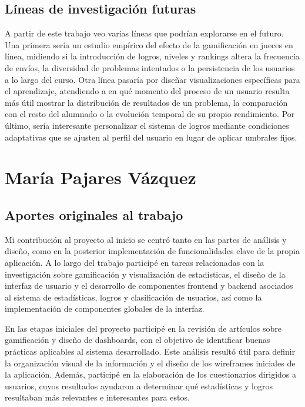 \subsection*{Líneas de investigación futuras}

A partir de este trabajo veo varias líneas que podrían explorarse en el futuro. Una primera sería un estudio empírico del efecto de la gamificación en jueces en línea, midiendo si la introducción de logros, niveles y rankings altera la frecuencia de envíos, la diversidad de problemas intentados o la persistencia de los usuarios a lo largo del curso. Otra línea pasaría por diseñar visualizaciones específicas para el aprendizaje, atendiendo a en qué momento del proceso de un usuario resulta más útil mostrar la distribución de resultados de un problema, la comparación con el resto del alumnado o la evolución temporal de su propio rendimiento. Por último, sería interesante personalizar el sistema de logros mediante condiciones adaptativas que se ajusten al perfil del usuario en lugar de aplicar umbrales fijos.

\section*{María Pajares Vázquez}

\subsection*{Aportes originales al trabajo}
Mi contribución al proyecto al inicio se centró tanto en las partes de análisis y diseño, como en la posterior implementación de funcionalidades clave de la propia aplicación. A lo largo del trabajo participé en tareas relacionadas con la investigación sobre gamificación y visualización de estadísticas, el diseño de la interfaz de usuario y el desarrollo de componentes frontend y backend asociados al sistema de estadísticas, logros y clasificación de usuarios, así como la implementación de componentes globales de la interfaz.

En las etapas iniciales del proyecto participé en la revisión de artículos sobre gamificación y diseño de dashboards, con el objetivo de identificar buenas prácticas aplicables al sistema desarrollado. Este análisis resultó útil para definir la organización visual de la información y el diseño de los wireframes iniciales de la aplicación. Además, participé en la elaboración de los cuestionarios dirigidos a usuarios, cuyos resultados ayudaron a determinar qué estadísticas y logros resultaban más relevantes e interesantes para estos. 

